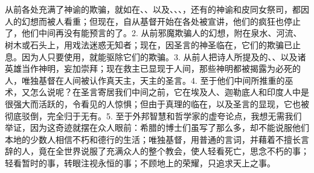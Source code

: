 
\section{}

从前各处充满了神谕的欺骗，就如在、、以及、、、，还有的神谕和皮同女祭司，都因人的幻想而被人看重；但现在，自从基督开始在各处被宣讲，他们的疯狂也停止了，他们中间再没有能预言的了。2. 从前邪魔欺骗人的幻想，附在泉水、河流、树木或石头上，用戏法迷惑无知者；现在，因圣言的神圣临在，它们的欺骗已止息。因为人只要使用，就能驱除它们的欺骗。3. 从前人把诗人所提及的、、以及诸英雄当作神明，妄加崇拜；现在救主已显现于人间，那些神明都被揭露为必死的人，唯独基督在人间被认作真天主，天主的圣言。4. 至于他们中间所推重的巫术，又怎么说呢？在圣言寄居我们中间之前，它在埃及人、迦勒底人和印度人中是很强大而活跃的，令看见的人惊惧；但由于真理的临在，以及圣言的显现，它也被彻底驳倒，完全归于无有。5. 至于外邦智慧和哲学家的虚夸论点，我想无需我们举证，因为这奇迹就摆在众人眼前：希腊的博士们虽写了那么多，却不能说服他们本地的少数人相信不朽和德行的生活；唯独基督，用普通的言词，并藉着不擅长言辞的人，竟在全世界说服了充满众人的整个教会，使人轻看死亡，思念不朽的事；轻看暂时的事，转眼注视永恒的事；不顾地上的荣耀，只追求天上之事。\par


\section{}

